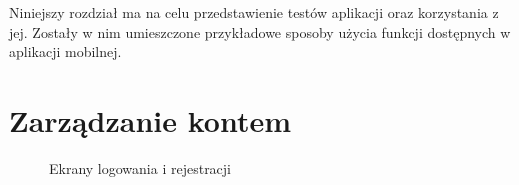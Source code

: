 
Niniejszy rozdział ma na celu przedstawienie testów aplikacji oraz korzystania z jej. Zostały w nim umieszczone przykładowe sposoby użycia funkcji dostępnych w aplikacji mobilnej.



\section{Zarządzanie kontem}{
	
\begin{figure}
	\centering
	\quad
	\caption{Ekrany logowania i rejestracji}
	\label{fig:registerpage}
\end{figure}

}
